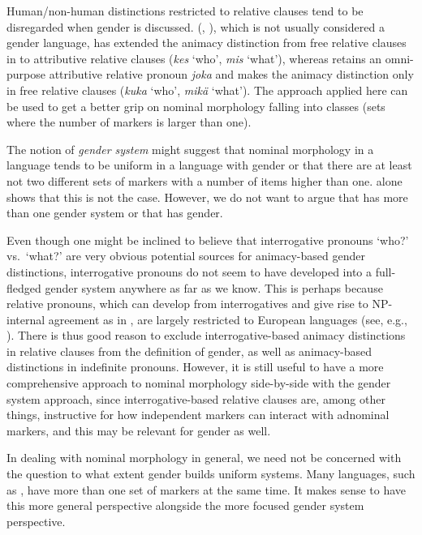 \documentclass[output=collectionpaper]{langsci/langscibook}
\begin{document}
Human/non-human distinctions restricted to relative clauses tend to be disregarded when gender is discussed.  (, ), which is not usually considered a gender language, has extended the animacy distinction from free relative clauses in  to attributive relative clauses (\textit{kes} `who', \textit{mis} `what'), whereas  retains an omni-purpose attributive relative pronoun \textit{joka} and makes the animacy distinction only in free relative clauses (\textit{kuka} `who', \textit{mikä} `what'). The approach applied here can be used to get a better grip on nominal morphology falling into classes (sets where the number of markers is larger than one).

The notion of \emph{gender system} might suggest that nominal morphology in a language tends to be uniform in a language with gender or that there are at least not two different sets of markers with a number of items higher than one.  alone shows that this is not the case. However, we do not want to argue that  has more than one gender system or that  has gender.

Even though one might be inclined to believe that interrogative pronouns `who?' vs.\ `what?' are very obvious potential sources for animacy-based gender distinctions, interrogative pronouns do not seem to have developed into a full-fledged gender system anywhere as far as we know. This is perhaps because relative pronouns, which can develop from interrogatives and give rise to NP-internal agreement as in , are largely restricted to European languages (see, e.g., \citealt{ComrieKuteva2013}). There is thus good reason to exclude interrogative-based animacy distinctions in relative clauses from the definition of gender, as well as animacy-based distinctions in indefinite pronouns. However, it is still useful to have a more comprehensive approach to nominal morphology side-by-side with the gender system approach, since interrogative-based relative clauses are, among other things, instructive for how independent markers can interact with adnominal markers, and this may be relevant for gender as well.

In dealing with nominal morphology in general, we need not be concerned with the question to what extent gender builds uniform systems. Many languages, such as , have more than one set of markers at the same time. It makes sense to have this more general perspective alongside the more focused gender system perspective.
\end{document}
